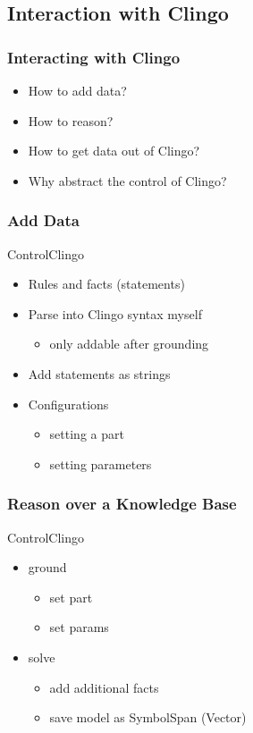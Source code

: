 \documentclass{beamer}
\begin{document}
\subsection{Interaction with Clingo}
\begin{frame}
\frametitle{Interacting with Clingo}
\begin{itemize}
\item How to add data?
\item How to reason?
\item How to get data out of Clingo?
\item Why abstract the control of Clingo?
\end{itemize}
\end{frame}

\begin{frame}
\frametitle{Add Data}
ControlClingo
\begin{itemize}
\item Rules and facts (statements)
\item Parse into Clingo syntax myself
\begin{itemize}
\item only addable after grounding
\end{itemize}
\item Add statements as strings
\item Configurations %
\begin{itemize} 
\item setting a part
\item setting parameters
\end{itemize}

\end{itemize}
\end{frame}

\begin{frame}
\frametitle{Reason over a Knowledge Base}
ControlClingo
\begin{itemize}
\item ground
\begin{itemize}
\item set part
\item set params
\end{itemize}
\item solve
\begin{itemize}
\item add additional facts
\item save model as SymbolSpan (Vector)
\end{itemize}
\end{itemize}
\end{frame}
\end{document}
